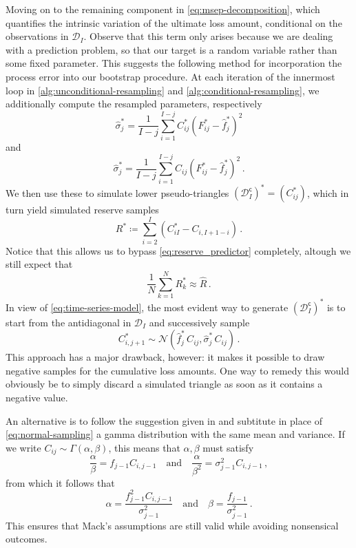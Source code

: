\documentclass[a4paper]{book}
\theoremstyle{plain}
\begin{document}
Moving on to the remaining component in \eqref{eq:msep-decomposition}, which quantifies the intrinsic variation of the ultimate loss amount, conditional on the observations in $\mathcal{D}_I$. Observe that this term only arises because we are dealing with a prediction problem, so that our target is a random variable rather than some fixed parameter. This suggests the following method for incorporation the process error into our bootstrap procedure. At each iteration of the innermost loop in \cref{alg:unconditional-resampling} and \cref{alg:conditional-resampling}, we additionally compute the resampled parameters, respectively
\begin{equation}
    \hat{\sigma}^*_j = \frac{1}{I-j}\sum_{i=1}^{I-j} C^*_{ij}\left( F^*_{ij} - \hat{f}^*_j \right)^2
\end{equation}
and
\begin{equation}
    \hat{\sigma}^*_j = \frac{1}{I-j}\sum_{i=1}^{I-j} C_{ij}\left( F^*_{ij} - \hat{f}^*_j \right)^2 \,.
\end{equation}
We then use these to simulate lower pseudo-triangles $(\mathcal{D}^{\mathsf{c}}_I)^* = (C^*_{ij})$, which in turn yield simulated reserve samples
\begin{equation}
    R^* \coloneqq \sum_{i = 2}^I (C^*_{iI} - C_{i, I + 1 - i}) \,.
\end{equation}
Notice that this allows us to bypass \eqref{eq:reserve_predictor} completely, altough we still expect that
\begin{equation}
    \frac{1}{N} \sum_{k = 1}^N R^*_k \approx \hat{R} \,.
\end{equation}
In view of \eqref{eq:time-series-model}, the most evident way to generate $(\mathcal{D}^{\mathsf{c}}_I)^*$ is to start from the antidiagonal in $\mathcal{D}_I$ and successively sample
\begin{equation} \label{eq:normal-sampling}
    C^*_{i, j + 1} \sim \mathcal{N}(\hat{f}^*_j \, C_{ij}, \hat{\sigma}^*_j \, C_{ij}) \,.
\end{equation}
This approach has a major drawback, however: it makes it possible to draw negative samples for the cumulative loss amounts. One way to remedy this would obviously be to simply discard a simulated triangle as soon as it contains a negative value. 

An alternative is to follow the suggestion given in \cite[238]{england:dist} and subtitute in place of \eqref{eq:normal-sampling} a gamma distribution with the same mean and variance. If we write $C_{ij} \sim \Gamma(\alpha, \beta)$, this means that $\alpha, \beta$ must satisfy
\begin{equation}
\frac{\alpha}{\beta} = f_{j-1} C_{i, j-1} \quad \text{and} \quad \frac{\alpha}{\beta^2} = \sigma^2_{j-1} C_{i, j-1} \,,
\end{equation}
from which it follows that
\begin{equation}
\alpha = \frac{f_{j-1}^2 C_{i, j-1}}{\sigma_{j-1}^2} \quad \text{and} \quad \beta = \frac{f_{j-1}}{\sigma_{j-1}^2} \,.
\end{equation}
This ensures that Mack's assumptions are still valid while avoiding nonsensical outcomes.
\end{document}
